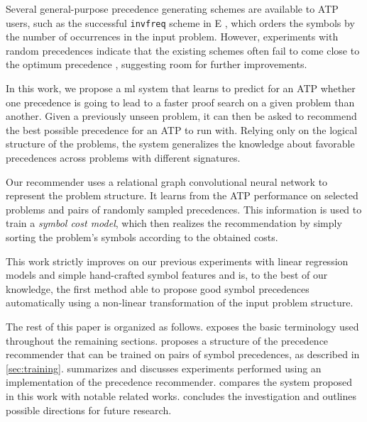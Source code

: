 
Several general-purpose precedence generating schemes are available to ATP users,
such as the successful \texttt{invfreq} scheme in E \cite{E-manual}, which orders the symbols 
by the number of occurrences in the input problem. However, experiments with random precedences
indicate that the existing schemes often fail to come close to the optimum precedence \cite{RegerSuda2017},
suggesting room for further improvements.

In this work, we propose a \acrlong{ml} system that learns to predict for an ATP
whether one precedence is going to lead to a faster proof search on a given problem than another.
Given a previously unseen problem, it can then be asked to recommend the best possible precedence for an ATP to run with.
Relying only on the logical structure of the problems, %
the system generalizes the knowledge about favorable precedences across problems with different signatures.

Our recommender uses a relational graph convolutional neural network \cite{Schlichtkrull2017}
to represent the problem structure. It learns from the ATP performance on selected problems
and pairs of randomly sampled precedences. This information is used to train
a \emph{symbol cost model}, which then realizes the recommendation by simply sorting 
the problem's symbols according to the obtained costs. 

This work strictly improves on our previous experiments with linear regression models and simple hand-crafted symbol features \cite{DBLP:conf/cade/Bartek020}
and is, to the best of our knowledge, the first method able to propose good symbol precedences automatically 
using a non-linear transformation of the input problem structure.

The rest of this paper is organized as follows.
 exposes the basic terminology used throughout the remaining sections.
 proposes a structure of the precedence recommender that can be trained on pairs of symbol precedences,
as described in \cref{sec:training}.
 summarizes and discusses experiments performed
using an implementation of the precedence recommender.
 compares the system proposed in this work with notable related works.
 concludes the investigation and outlines possible directions for future research.

